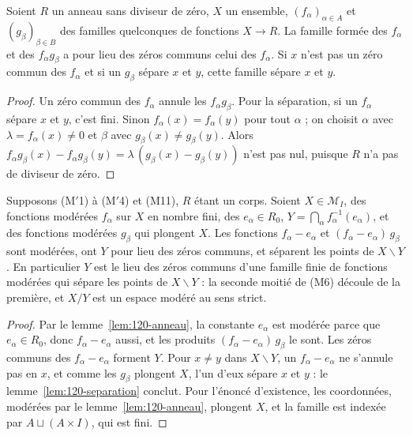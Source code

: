 \begin{lemme}\label{lem:120-separation}
Soient $R$ un anneau sans diviseur de zéro, $X$ un ensemble, $(f_\alpha)_{\alpha \in A}$ et $(g_\beta)_{\beta \in B}$ des familles quelconques de fonctions $X \to R$. La famille formée des $f_\alpha$ et des $f_\alpha g_\beta$ a pour lieu des zéros communs celui des $f_\alpha$. Si $x$ n'est pas un zéro commun des $f_\alpha$ et si un $g_\beta$ sépare $x$ et $y$, cette famille sépare $x$ et $y$.
\end{lemme}

\begin{proof}
Un zéro commun des $f_\alpha$ annule les $f_\alpha g_\beta$. Pour la séparation, si un $f_\alpha$ sépare $x$ et $y$, c'est fini. Sinon $f_\alpha(x) = f_\alpha(y)$ pour tout $\alpha$ ; on choisit $\alpha$ avec $\lambda = f_\alpha(x) \neq 0$ et $\beta$ avec $g_\beta(x) \neq g_\beta(y)$. Alors $f_\alpha g_\beta(x) - f_\alpha g_\beta(y) = \lambda\,(g_\beta(x) - g_\beta(y))$ n'est pas nul, puisque $R$ n'a pas de diviseur de zéro.
\end{proof}

\begin{encadre}
\begin{theoreme}\label{thm:120-ecrasement}
Supposons (M$'$1) à (M$'$4) et (M11), $R$ étant un corps. Soient $X \in \mathcal M_I$, des fonctions modérées $f_\alpha$ sur $X$ en nombre fini, des $e_\alpha \in R_0$, $Y = \bigcap_\alpha f_\alpha^{-1}(e_\alpha)$, et des fonctions modérées $g_\beta$ qui plongent $X$. Les fonctions $f_\alpha - e_\alpha$ et $(f_\alpha - e_\alpha)\,g_\beta$ sont modérées, ont $Y$ pour lieu des zéros communs, et séparent les points de $X \smallsetminus Y$. En particulier $Y$ est le lieu des zéros communs d'une famille finie de fonctions modérées qui sépare les points de $X \smallsetminus Y$ : la seconde moitié de (M6) découle de la première, et $X/Y$ est un espace modéré au sens strict.
\end{theoreme}
\end{encadre}

\begin{proof}
Par le lemme~\ref{lem:120-anneau}, la constante $e_\alpha$ est modérée parce que $e_\alpha \in R_0$, donc $f_\alpha - e_\alpha$ aussi, et les produits $(f_\alpha - e_\alpha)\,g_\beta$ le sont. Les zéros communs des $f_\alpha - e_\alpha$ forment $Y$. Pour $x \neq y$ dans $X \smallsetminus Y$, un $f_\alpha - e_\alpha$ ne s'annule pas en $x$, et comme les $g_\beta$ plongent $X$, l'un d'eux sépare $x$ et $y$ : le lemme~\ref{lem:120-separation} conclut. Pour l'énoncé d'existence, les coordonnées, modérées par le lemme~\ref{lem:120-anneau}, plongent $X$, et la famille est indexée par $A \sqcup (A \times I)$, qui est fini.
\end{proof}

